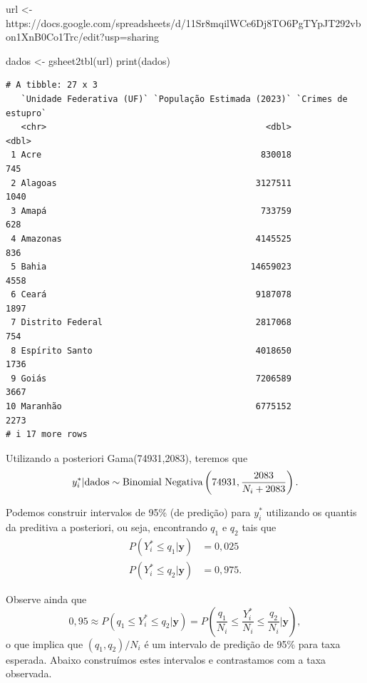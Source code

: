 \documentclass[
  letterpaper,
  DIV=11,
  numbers=noendperiod]{scrreprt}
\newenvironment{Shaded}{\begin{snugshade}}{\end{snugshade}}
\newcommand{\FunctionTok}[1]{\textcolor[rgb]{0.28,0.35,0.67}{#1}}
\newcommand{\NormalTok}[1]{\textcolor[rgb]{0.00,0.23,0.31}{#1}}
\newcommand{\OtherTok}[1]{\textcolor[rgb]{0.00,0.23,0.31}{#1}}
\newcommand{\StringTok}[1]{\textcolor[rgb]{0.13,0.47,0.30}{#1}}
\theoremstyle{definition}
\theoremstyle{plain}
\theoremstyle{definition}
\theoremstyle{remark}
\begin{document}
\begin{Shaded}
\begin{Highlighting}[]
\NormalTok{url }\OtherTok{\textless{}{-}} \StringTok{\textquotesingle{}https://docs.google.com/spreadsheets/d/11Sr8mqilWCe6Dj8TO6PgTYpJT292vbon1XnB0Co1Trc/edit?usp=sharing\textquotesingle{}}

\NormalTok{dados }\OtherTok{\textless{}{-}} \FunctionTok{gsheet2tbl}\NormalTok{(url)}
\FunctionTok{print}\NormalTok{(dados)}
\end{Highlighting}
\end{Shaded}

\begin{verbatim}
# A tibble: 27 x 3
   `Unidade Federativa (UF)` `População Estimada (2023)` `Crimes de estupro`
   <chr>                                           <dbl>               <dbl>
 1 Acre                                           830018                 745
 2 Alagoas                                       3127511                1040
 3 Amapá                                          733759                 628
 4 Amazonas                                      4145525                 836
 5 Bahia                                        14659023                4558
 6 Ceará                                         9187078                1897
 7 Distrito Federal                              2817068                 754
 8 Espírito Santo                                4018650                1736
 9 Goiás                                         7206589                3667
10 Maranhão                                      6775152                2273
# i 17 more rows
\end{verbatim}

Utilizando a posteriori Gama(74931,2083), teremos que
\[y_i^*|\hbox{dados}\sim\hbox{Binomial Negativa}\left(74931,\frac{2083}{N_i+2083}\right).\]

Podemos construir intervalos de 95\% (de predição) para \(y^*_i\)
utilizando os quantis da preditiva a posteriori, ou seja, encontrando
\(q_1\) e \(q_2\) tais que \[\begin{align}
P(Y_i^*\leq q_1|\boldsymbol{y})&=0,025\\
P(Y_i^*\leq q_2|\boldsymbol{y})&=0,975.
\end{align}
\]

Observe ainda que
\[0,95\approx P(q_1\leq Y_i^*\leq q_2|\boldsymbol{y})=P\left(\frac{q_1}{N_i}\leq \frac{Y_i^*}{N_i}\leq \frac{q_2}{N_i}|\boldsymbol{y}\right),\]
o que implica que \((q_1,q_2)/N_i\) é um intervalo de predição de 95\%
para taxa esperada. Abaixo construímos estes intervalos e contrastamos
com a taxa observada.
\end{document}
